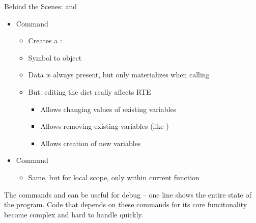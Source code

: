 \begin{frame}{Behind the Scenes:  and }
%
\begin{itemize}
\item Command 
	\begin{itemize}
	\item Creates a :  \thus {}
	\item Symbol to object
	\item Data is always present, but  only materializes when calling 
	\item But: editing the dict really affects RTE
		\begin{itemize}
		\item Allows changing values of existing variables
		\item Allows removing existing variables (like )
		\item Allows creation of new variables
		\end{itemize}
	\end{itemize}
\item Command 
	\begin{itemize}
	\item Same, but for local scope, \ie only within current function
	\end{itemize}
\end{itemize}
%
\begin{hintbox}
\footnotesize
The commands  and  can be useful for debug -- one line shows the entire state of the program. Code that depends on these commands for its core funcitonality become complex and hard to handle quickly.
\end{hintbox}
%
\end{frame}



